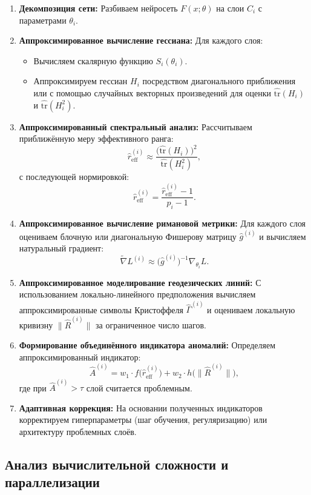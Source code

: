 \documentclass[a4paper,12pt]{article}
\begin{document}
\begin{enumerate}
\item \textbf{Декомпозиция сети:} Разбиваем нейросеть \( F(x;\theta) \) на слои \( C_i \) с параметрами \(\theta_i\).
\item \textbf{Аппроксимированное вычисление гессиана:} Для каждого слоя:
    \begin{itemize}
    \item Вычисляем скалярную функцию \( S_i(\theta_i) \).
    \item Аппроксимируем гессиан \( H_i \) посредством диагонального приближения или с помощью случайных векторных произведений для оценки \(\widehat{\text{tr}}(H_i)\) и \(\widehat{\text{tr}}(H_i^2)\).
    \end{itemize}
\item \textbf{Аппроксимированный спектральный анализ:} Рассчитываем приближённую меру эффективного ранга:
    \[
    \widehat{r}_{\text{eff}}^{(i)} \approx \frac{\Big(\widehat{\text{tr}}(H_i)\Big)^2}{\widehat{\text{tr}}(H_i^2)},
    \]
    с последующей нормировкой:
    \[
    \hat{r}_{\text{eff}}^{(i)} = \frac{\widehat{r}_{\text{eff}}^{(i)} - 1}{p_i - 1}.
    \]
\item \textbf{Аппроксимированное вычисление римановой метрики:} Для каждого слоя оцениваем блочную или диагональную Фишерову матрицу \( \hat{g}^{(i)} \) и вычисляем натуральный градиент:
    \[
    \tilde{\nabla} L^{(i)} \approx \big(\hat{g}^{(i)}\big)^{-1}\nabla_{\theta_i} L.
    \]
\item \textbf{Аппроксимированное моделирование геодезических линий:} С использованием локально-линейного предположения вычисляем аппроксимированные символы Кристоффеля \(\hat{\Gamma}^{(i)}\) и оцениваем локальную кривизну \(\|\hat{R}^{(i)}\|\) за ограниченное число шагов.
\item \textbf{Формирование объединённого индикатора аномалий:} Определяем аппроксимированный индикатор:
    \[
    \hat{A}^{(i)} = w_1 \cdot f\big(\hat{r}_{\text{eff}}^{(i)}\big) + w_2 \cdot h\big(\|\hat{R}^{(i)}\|\big),
    \]
    где при \( \hat{A}^{(i)} > \tau \) слой считается проблемным.
\item \textbf{Адаптивная коррекция:} На основании полученных индикаторов корректируем гиперпараметры (шаг обучения, регуляризацию) или архитектуру проблемных слоёв.
\end{enumerate}

\subsection*{Анализ вычислительной сложности и параллелизации}
\end{document}
